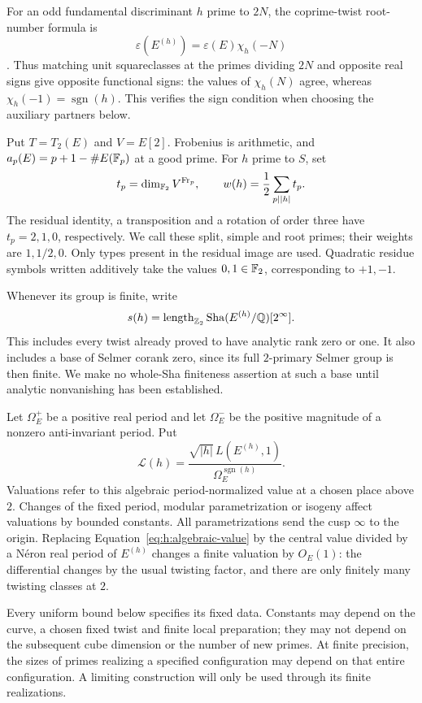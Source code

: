 For an odd fundamental discriminant $h$ prime to $2N$, the
coprime-twist root-number formula is
\[
 \varepsilon(E^{(h)})=\varepsilon(E)\chi_h(-N)
\]
\citep[Section~1]{RadziwillSoundararajan2015}.
Thus matching unit squareclasses at the primes dividing $2N$ and
opposite real signs give opposite functional signs: the values of
$\chi_h(N)$ agree, whereas $\chi_h(-1)=\operatorname{sgn}(h)$.
This verifies the sign condition when choosing the auxiliary partners
below.

Put $T=T_2(E)$ and $V=E[2]$. Frobenius is arithmetic, and
$a_p(E)=p+1-\#E(\mathbb F_p)$ at a good prime. For $h$ prime to $S$, set
\begin{equation}\label{eq:h:weights}
 t_p=\dim_{\mathbb F_2}V^{\operatorname{Fr}_p},\qquad
 w(h)=\frac12\sum_{p\mid |h|}t_p.
\end{equation}
The residual identity, a transposition and a rotation of order three
have $t_p=2,1,0$, respectively. We call these split, simple and root
primes; their weights are $1,1/2,0$. Only types present in the
residual image are used. Quadratic residue symbols written additively
take the values $0,1\in\mathbb F_2$, corresponding to $+1,-1$.

Whenever its group is finite, write
\[
 s(h)=\operatorname{length}_{\mathbb Z_2}\operatorname{Sha}(E^{(h)}/\mathbb Q)[2^\infty].
\]
This includes every twist already proved to have analytic rank zero
or one. It also includes a base of Selmer corank zero, since its full
$2$-primary Selmer group is then finite. We make no whole-Sha
finiteness assertion at such a base until analytic nonvanishing has
been established.

Let $\Omega_E^+$ be a positive real period and let $\Omega_E^-$ be
the positive magnitude of a nonzero anti-invariant period. Put
\begin{equation}\label{eq:h:algebraic-value}
 \mathcal L(h)=
 \frac{\sqrt{|h|}\,L(E^{(h)},1)}{\Omega_E^{\operatorname{sgn}(h)}}.
\end{equation}
Valuations refer to this algebraic period-normalized value at a chosen
place above $2$. Changes of the fixed period, modular parametrization
or isogeny affect valuations by bounded constants. All parametrizations
send the cusp $\infty$ to the origin.
Replacing Equation~\eqref{eq:h:algebraic-value} by the central value
divided by a N\'eron real period of $E^{(h)}$ changes a finite valuation
by $O_E(1)$: the differential changes by the usual twisting factor,
and there are only finitely many twisting classes at $2$.

Every uniform bound below specifies its fixed data. Constants may
depend on the curve, a chosen fixed twist and finite local preparation;
they may not depend on the subsequent cube dimension or the number of
new primes. At finite precision, the sizes of primes realizing a
specified configuration may depend on that entire configuration.
A limiting construction will only be used through its finite
realizations.

